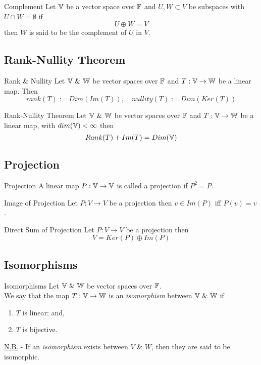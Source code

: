 \documentclass[11pt,a4paper]{article}
\begin{document}
\subtitle{Theorem 7.18 - }{Complement}
Let $\mathbb{V}$ be a vector space over $\mathbb{F}$ and $U, W \subset V$ be subspaces with $U \cap W = \emptyset$ if
$$U \oplus W = V$$
then $W$ is said to be the complement of $U$ in $V$.

\subsection{Rank-Nullity Theorem}

\subtitle{Definition 7.19 - }{Rank \& Nullity}
Let $\mathbb{V}\ \&\ \mathbb{W}$ be vector spaces over $\mathbb{F}$ and $T : \mathbb{V} \to \mathbb{W}$ be a linear map. Then
$$rank(T) := Dim(Im(T)),\quad nullity(T) := Dim(Ker(T))$$

\subtitle{Theorem 7.20 - }{Rank-Nullity Theorem}
Let $\mathbb{V}\ \&\ \mathbb{W}$ be vector spaces over $\mathbb{F}$ and $T : \mathbb{V} \to \mathbb{W}$ be a linear map, with $dim(\mathbb{V}) < \infty$ then
$$Rank(T) + Im(T) = Dim(\mathbb{V})$$

\subsection{Projection}

\subtitle{Defintion 7.21 - }{Projection}
A linear map $P : \mathbb{V} \to \mathbb{V}$ is called a projection if $P^2 = P$.\\

\subtitle{Theorem 7.22 - }{Image of Projection}
Let $P : V \to V$ be a projection then $v \in Im(P)$ iff $P(v) = v$.\\

\subtitle{Theorem 7.23 - }{Direct Sum of Projection}
Let $P : V \to V$ be a projection then
$$V = Ker(P) \oplus Im(P)$$

\subsection{Isomorphisms}

\subtitle{Definition 7.24 -}{Isomorphisms}
Let $\mathbb{V}\ \&\ \mathbb{W}$ be vector spaces over $\mathbb{F}$. \\
We say that the map $T : \mathbb{V} \to \mathbb{W}$ is an \textit{isomorphism} between $\mathbb{V}\ \&\ \mathbb{W}$ if
\begin{enumerate}[label=\roman*)]
  \item $T$ is linear; and,
  \item $T$ is bijective.
\end{enumerate}
\underline{N.B.} - If an \textit{isomorphism} exists between $V$ \& $W$, then they are said to be isomorphic.\\
\end{document}
